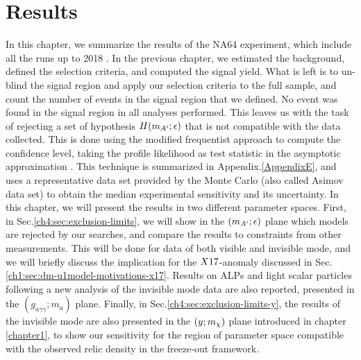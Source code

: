 
\newcommand{\pdirfour}{chapters/plots/chapter4}

\chapter{Results} %

\label{chapter4} %

In this chapter, we summarize the results of the NA64 experiment, which include all the runs up to 2018 \cite{Banerjee:2020fue,Banerjee:2019hmi,NA64:2019imj,na64-prd,Banerjee:2018vgk,Banerjee:2016tad}. In the previous chapter, we estimated the background, defined the selection criteria, and computed the signal yield. What is left is to un-blind the signal region and apply our selection criteria to the full sample, and count the number of events in the signal region that we defined. No event was found in the signal region in all analyses performed. This leaves us with the task of rejecting a set of hypothesis $H(m_{A'};\epsilon)$ that is not compatible with the data collected. This is done using the modified frequentist approach to compute the confidence level, taking the profile likelihood as test statistic in the asymptotic approximation \cite{Read_2002,JUNK1999435,Cowan:2010js}. This technique is summarized in Appendix.\ref{AppendixE}, and uses a representative data set provided by the Monte Carlo (also called Asimov data set) to obtain the median experimental sensitivity and its uncertainty. In this chapter, we will present the results in two different parameter spaces. First, in Sec.\ref{ch4:sec:exclusion-limits}, we will show in the $(m_{A'};\epsilon)$ plane which models are rejected by our searches, and compare the results to constraints from other measurements. This will be done for data of both visible and invisible mode, and we will briefly discuss the implication for the $X17$-anomaly discussed in Sec.\ref{ch1:sec:dm-u1model-motivations-x17}. Results on ALPs and light scalar particles following a new analysis of the invisible mode data are also reported, presented in the $(g_{a\gamma \gamma};m_a)$ plane. Finally, in Sec.\ref{ch4:sec:exclusion-limits-y}, the results of the invisible mode are also presented in the $(y;m_{\chi})$ plane introduced in chapter \ref{chapter1}, to show our sensitivity for the region of parameter space compatible with the observed relic density in the freeze-out framework.


